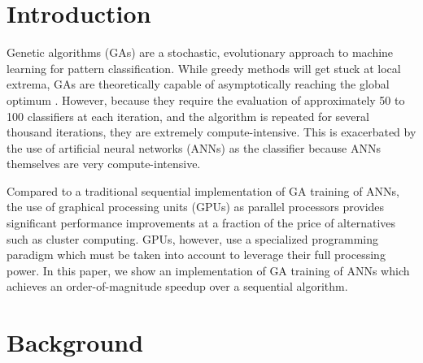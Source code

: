 \documentclass[11pt]{article}       %
\begin{document}
\section{Introduction} \label{intro}
Genetic algorithms (GAs) are a stochastic, evolutionary approach to machine learning for pattern classification. While greedy methods will get stuck at local extrema, GAs  are theoretically capable of asymptotically reaching the global optimum \cite{GA-ANN}. However, because they require the evaluation of approximately 50 to 100 classifiers at each iteration, and the algorithm is repeated for several thousand iterations, they are extremely compute-intensive. This is exacerbated by the use of artificial neural networks (ANNs) as the classifier because ANNs themselves are very compute-intensive.

Compared to a traditional sequential implementation of GA training of ANNs, the use of graphical processing units (GPUs) as parallel processors provides significant performance improvements at a fraction of the price of alternatives such as cluster computing. GPUs, however, use a specialized programming paradigm which must be taken into account to leverage their full processing power. In this paper, we show an implementation of GA training of ANNs which achieves an order-of-magnitude speedup over a sequential algorithm.

\section{Background} \label{background}

\end{document}

